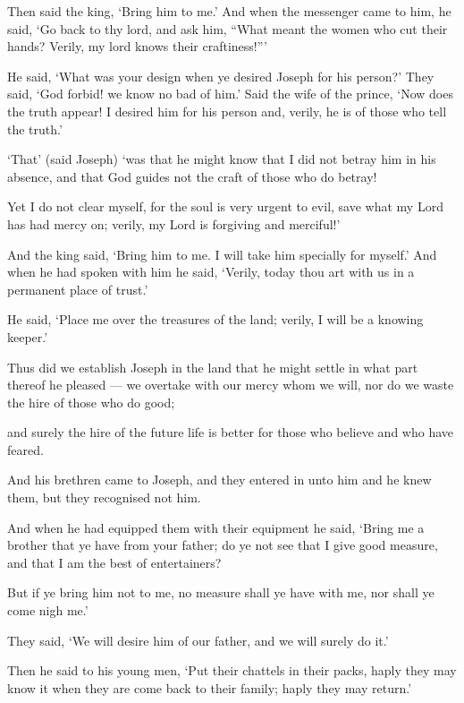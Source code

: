 \documentclass[fontsize=14pt, letterpaper, notitlepage, openany, DIV=12]{scrbook} %
\begin{document}
\noindent[12:50]
Then said the king, `Bring him to me.' And when the messenger came to him, he said,
`Go back to thy lord, and ask him, ``What meant the women who cut their hands? Verily, my lord
knows their craftiness!''\hspace{0.1em}'

\noindent[12:51]
He said, `What was your design when ye desired Joseph for his person?' They said, `God
forbid! we know no bad of him.' Said the wife of the prince, `Now does the truth appear! I
desired him for his person and, verily, he is of those who tell the truth.'

\noindent[12:52]
`That' (said Joseph) `was that he might know that I did not betray him in his absence, and
that God guides not the craft of those who do betray!

\noindent[12:53]
Yet I do not clear myself, for the soul is very urgent to evil, save what my Lord has had
mercy on; verily, my Lord is forgiving and merciful!'

\noindent[12:54]
And the king said, `Bring him to me. I will take him specially for myself.' And when he
had spoken with him he said, `Verily, today thou art with us in a permanent place of trust.'

\noindent[12:55]
He said, `Place me over the treasures of the land; verily, I will be a knowing keeper.'

\noindent[12:56]
Thus did we establish Joseph in the land that he might settle in what part thereof he
pleased --- we overtake with our mercy whom we will, nor do we waste the hire of those who do
good;

\noindent[12:57]
and surely the hire of the future life is better for those who believe and who have feared.

\noindent[12:58]
And his brethren came to Joseph, and they entered in unto him and he knew them, but
they recognised not him.

\noindent[12:59]
And when he had equipped them with their equipment he said, `Bring me a brother that
ye have from your father; do ye not see that I give good measure, and that I am the best of
entertainers?

\noindent[12:60]
But if ye bring him not to me, no measure shall ye have with me, nor shall ye come nigh
me.'

\noindent[12:61]
They said, `We will desire him of our father, and we will surely do it.'

\noindent[12:62]
Then he said to his young men, `Put their chattels in their packs, haply they may know it
when they are come back to their family; haply they may return.'
\end{document}
